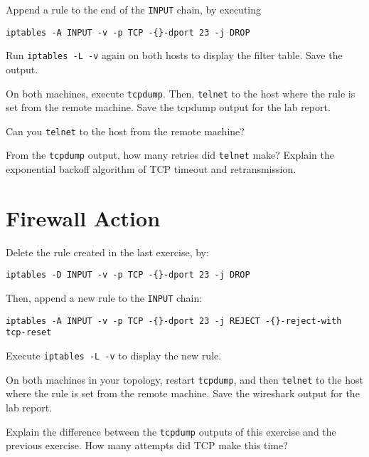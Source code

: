 \documentclass{../UTNetLab}
\begin{document}
    Append a rule to the end of the \texttt{INPUT} chain, by executing
    \begin{lstlisting}
iptables -A INPUT -v -p TCP -{}-dport 23 -j DROP
    \end{lstlisting}
    
    Run \lstinline{iptables -L -v} again on both hosts to display the filter table. Save the output.

    On both machines, execute \lstinline{tcpdump}. Then, \lstinline{telnet} to the host where the rule is set from the remote machine. Save the tcpdump output for the lab report.

    \begin{report}
    \item Can you \lstinline{telnet} to the host from the remote machine?
    
    \item From the \lstinline{tcpdump} output, how many retries did \lstinline{telnet} make? Explain the exponential backoff algorithm of TCP timeout and retransmission.
    \end{report}
    
\section{Firewall Action}
    Delete the rule created in the last exercise, by:    
    \begin{lstlisting}
iptables -D INPUT -v -p TCP -{}-dport 23 -j DROP
    \end{lstlisting}
    
    Then, append a new rule to the \texttt{INPUT} chain:    
    \begin{lstlisting}
iptables -A INPUT -v -p TCP -{}-dport 23 -j REJECT -{}-reject-with tcp-reset
    \end{lstlisting}
    
    Execute \lstinline{iptables -L -v} to display the new rule.

    On both machines in your topology, restart \lstinline{tcpdump}, and then \lstinline{telnet} to the host where the rule is set from the remote machine. Save the wireshark output for the lab report.
    
    \begin{report}
    \item Explain the difference between the \lstinline{tcpdump} outputs of this exercise and the previous exercise. How many attempts did {TCP} make this time?
    \end{report}
\end{document}
